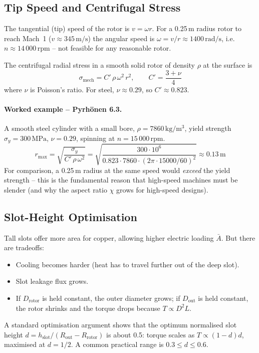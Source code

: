 \documentclass[12pt,a4paper]{article}
\newcommand{\unit}[1]{\ensuremath{\,\mathrm{#1}}}
\begin{document}
\subsection{Tip Speed and Centrifugal Stress}

The tangential (tip) speed of the rotor is $v = \omega r$. For a
0.25\unit{m} radius rotor to reach Mach~1
($v \approx 345\unit{m/s}$) the angular speed is
$\omega = v/r \approx 1400\unit{rad/s}$, i.e.\ $n \approx 14\,000\unit{rpm}$ --
not feasible for any reasonable rotor.

The centrifugal radial stress in a smooth solid rotor of density
$\rho$ at the surface is
\begin{equation}
  \sigma_\text{mech} = C'\,\rho\,\omega^2\,r^2,
  \qquad
  C' = \frac{3+\nu}{4}
\end{equation}
where $\nu$ is Poisson's ratio. For steel, $\nu \approx 0.29$, so
$C' \approx 0.823$.

\paragraph{Worked example -- Pyrh\"onen 6.3.}
A smooth steel cylinder with a small bore, $\rho = 7860\unit{kg/m^3}$,
yield strength $\sigma_y = 300\unit{MPa}$, $\nu = 0.29$, spinning at
$n=15\,000\unit{rpm}$.
\begin{equation}
  r_\text{max} = \sqrt{\frac{\sigma_y}{C'\,\rho\,\omega^2}}
              = \sqrt{\frac{300\cdot 10^6}{0.823\cdot 7860\cdot(2\pi\cdot 15000/60)^2}}
              \approx 0.13\unit{m}
\end{equation}
For comparison, a 0.25\unit{m} radius at the same speed would
\emph{exceed} the yield strength -- this is the fundamental reason
that high-speed machines must be slender (and why the aspect ratio
$\chi$ grows for high-speed designs).

\subsection{Slot-Height Optimisation}

Tall slots offer more area for copper, allowing higher electric
loading $\bar A$. But there are tradeoffs:
\begin{itemize}[noitemsep]
  \item Cooling becomes harder (heat has to travel further out of the
        deep slot).
  \item Slot leakage flux grows.
  \item If $D_\text{rotor}$ is held constant, the outer diameter
        grows; if $D_\text{out}$ is held constant, the rotor shrinks
        and the torque drops because $T \propto D^2 L$.
\end{itemize}
A standard optimisation argument shows that the optimum normalised
slot height $d = h_\text{slot}/(R_\text{out}-R_\text{rotor})$ is about
0.5: torque scales as $T \propto (1-d)d$, maximised at $d = 1/2$.
A common practical range is $0.3 \le d \le 0.6$.
\end{document}

